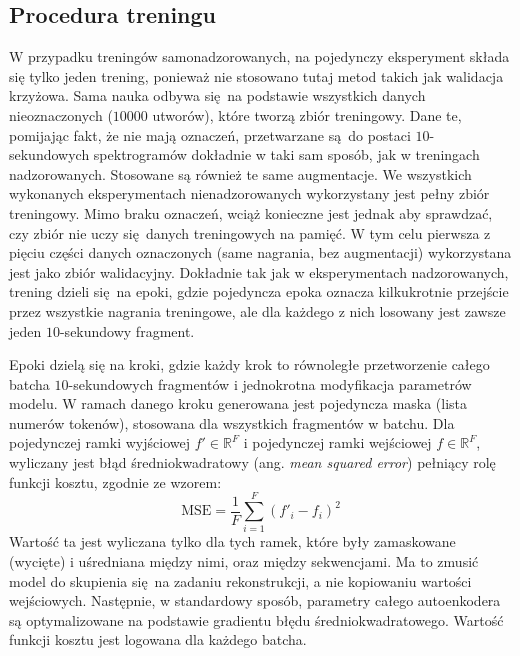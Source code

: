 \subsection{Procedura treningu}

W przypadku treningów samonadzorowanych, na pojedynczy eksperyment składa się tylko jeden trening,
ponieważ nie stosowano tutaj metod takich jak walidacja krzyżowa. Sama nauka odbywa się na podstawie
wszystkich danych nieoznaczonych ($10000$ utworów), które tworzą zbiór treningowy. Dane te,
pomijając fakt, że nie mają oznaczeń, przetwarzane są do postaci $10$-sekundowych spektrogramów
dokładnie w taki sam sposób, jak w treningach nadzorowanych. Stosowane są również te same
augmentacje. We wszystkich wykonanych eksperymentach nienadzorowanych wykorzystany jest pełny zbiór
treningowy. Mimo braku oznaczeń, wciąż konieczne jest jednak aby sprawdzać, czy zbiór nie uczy
się danych treningowych na pamięć. W tym celu pierwsza z pięciu części danych oznaczonych (same
nagrania, bez augmentacji) wykorzystana jest jako zbiór walidacyjny. Dokładnie tak jak w
eksperymentach nadzorowanych, trening dzieli się na epoki, gdzie pojedyncza epoka oznacza
kilkukrotnie przejście przez wszystkie nagrania treningowe, ale dla każdego z nich losowany jest
zawsze jeden $10$-sekundowy fragment.

Epoki dzielą się na kroki, gdzie każdy krok to równoległe przetworzenie całego batcha
$10$-sekundowych fragmentów i jednokrotna modyfikacja parametrów modelu. W ramach danego kroku
generowana jest pojedyncza maska (lista numerów tokenów), stosowana dla wszystkich fragmentów w
batchu. Dla pojedynczej ramki wyjściowej $f' \in \mathbb{R}^F$ i pojedynczej ramki wejściowej $f \in
\mathbb{R}^F$, wyliczany jest błąd średniokwadratowy (ang. \emph{mean squared error}) pełniący rolę
funkcji kosztu, zgodnie ze wzorem:
\begin{equation}
    \textrm{MSE} = \frac{1}{F} \sum_{i=1}^{F} (f'_{i} - f_{i})^2
\end{equation}
Wartość ta jest wyliczana tylko dla tych ramek, które były zamaskowane (wycięte) i uśredniana między
nimi, oraz między sekwencjami. Ma to zmusić model do skupienia się na zadaniu rekonstrukcji, a nie
kopiowaniu wartości wejściowych.  Następnie, w standardowy sposób, parametry całego autoenkodera są
optymalizowane na podstawie gradientu błędu średniokwadratowego.  Wartość funkcji kosztu jest
logowana dla każdego batcha.

